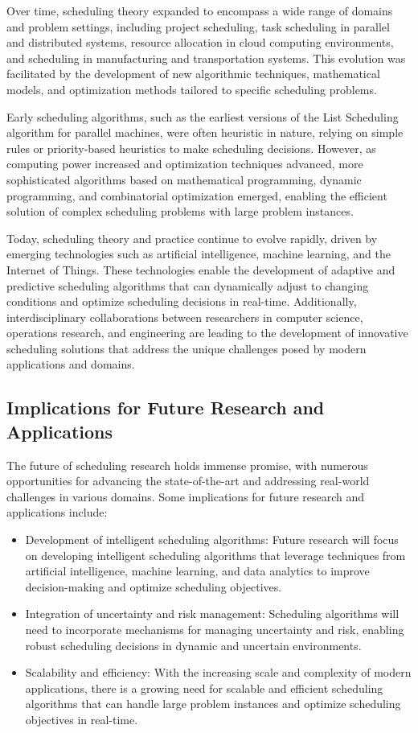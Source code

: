 \documentclass[12pt]{book} %
\begin{document}
Over time, scheduling theory expanded to encompass a wide range of domains and problem settings, including project scheduling, task scheduling in parallel and distributed systems, resource allocation in cloud computing environments, and scheduling in manufacturing and transportation systems. This evolution was facilitated by the development of new algorithmic techniques, mathematical models, and optimization methods tailored to specific scheduling problems.

Early scheduling algorithms, such as the earliest versions of the List Scheduling algorithm for parallel machines, were often heuristic in nature, relying on simple rules or priority-based heuristics to make scheduling decisions. However, as computing power increased and optimization techniques advanced, more sophisticated algorithms based on mathematical programming, dynamic programming, and combinatorial optimization emerged, enabling the efficient solution of complex scheduling problems with large problem instances.

Today, scheduling theory and practice continue to evolve rapidly, driven by emerging technologies such as artificial intelligence, machine learning, and the Internet of Things. These technologies enable the development of adaptive and predictive scheduling algorithms that can dynamically adjust to changing conditions and optimize scheduling decisions in real-time. Additionally, interdisciplinary collaborations between researchers in computer science, operations research, and engineering are leading to the development of innovative scheduling solutions that address the unique challenges posed by modern applications and domains.

\subsection{Implications for Future Research and Applications}
The future of scheduling research holds immense promise, with numerous opportunities for advancing the state-of-the-art and addressing real-world challenges in various domains. Some implications for future research and applications include:

\begin{itemize}
    \item Development of intelligent scheduling algorithms: Future research will focus on developing intelligent scheduling algorithms that leverage techniques from artificial intelligence, machine learning, and data analytics to improve decision-making and optimize scheduling objectives.
    \item Integration of uncertainty and risk management: Scheduling algorithms will need to incorporate mechanisms for managing uncertainty and risk, enabling robust scheduling decisions in dynamic and uncertain environments.
    \item Scalability and efficiency: With the increasing scale and complexity of modern applications, there is a growing need for scalable and efficient scheduling algorithms that can handle large problem instances and optimize scheduling objectives in real-time.
\end{itemize}
\end{document}
